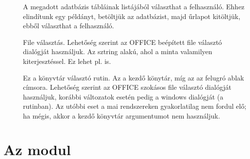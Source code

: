 \begin{description}
\item[] A megadott
   adatbázis 
  tábláinak listájából választhat a felhasználó. Ehhez elindítunk egy
   példányt, betöltjük az adatbázist, majd 
  űrlapot kitöltjük, ebből választhat a felhasználó. 
\item[]
  File választás.  Lehetőség szerint az OFFICE beépített file
  választó dialógját használjuk. Az   sztring
  alakú, ahol 
  a minta  valamilyen kiterjesztéssel. Ez lehet
  pl.  is.
\item[] Ez a könyvtár választó
  rutin. Az  
  a kezdő könytár,  míg az  az felugró ablak címsora. Lehetőség
  szerint az OFFICE szokásos file választó dialógját használjuk,
  korábbi változatok esetén pedig a windows  dialógját (a  rutinban). Az utóbbi
  eset a mai rendszereken gyakorlatilag nem fordul elő; ha mégis,
  akkor a kezdő könyvtár argumentumot  nem használjuk.
\end{description}

\section{Az  modul}\label{sec:5.3}

